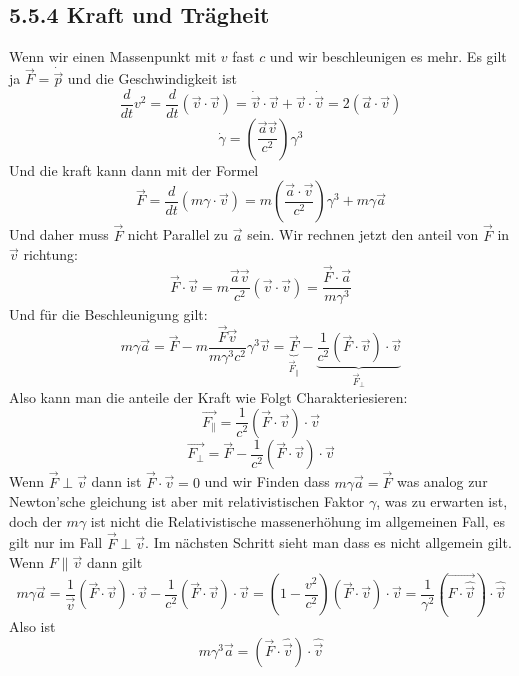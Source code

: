 \documentclass{article}
\begin{document}
\subsection*{5.5.4 Kraft und Trägheit}
Wenn wir einen Massenpunkt mit $v$ fast $c$ und wir beschleunigen es mehr. Es gilt ja $\vec{F}=\dot{\vec{p}}$ und die Geschwindigkeit ist \[\frac{d}{dt}v^2=\frac{d}{dt}(\vec{v}\cdot\vec{v})=\dot{\vec{v}}\cdot\vec{v}+\vec{v}\cdot\dot{\vec{v}}=2(\vec{a}\cdot \vec{v})\]\[\dot{\gamma}=\left(\frac{\vec{a}\vec{v}}{c^2}\right)\gamma^3\]
Und die kraft kann dann mit der Formel \[\vec{F}=\frac{d}{dt}\left(m\gamma\cdot \vec{v}\right)=m\left(\frac{\vec{a}\cdot\vec{v}}{c^2}\right)\gamma^3+m\gamma\vec{a}\] Und daher muss $\vec{F}$ nicht Parallel zu $\vec{a}$ sein.
Wir rechnen jetzt den anteil von $\vec{F}$ in $\vec{v}$ richtung: \[\vec{F}\cdot\vec{v}=m\frac{\vec{a}\vec{v}}{c^2}(\vec{v}\cdot\vec{v})=\frac{\vec{F}\cdot\vec{a}}{m\gamma^3}\]
Und für die Beschleunigung gilt:\[m\gamma \vec{a}=\vec{F}-m\frac{\vec{F}\vec{v}}{m\gamma^3c^2}\gamma^3\vec{v}=\underset{\vec{F}_\parallel}{\underbrace{\vec{F}}}-\underset{\vec{F}_\perp}{\underbrace{\frac{1}{c^2}(\vec{F}\cdot\vec{v})\cdot\vec{v}}}\]
Also kann man die anteile der Kraft wie Folgt Charakteriesieren:
\[\vec{F_\parallel}=\frac{1}{c^2}(\vec{F}\cdot\vec{v})\cdot\vec{v}\]
\[\vec{F_\perp}=\vec{F}-\frac{1}{c^2}(\vec{F}\cdot\vec{v})\cdot\vec{v}\]
Wenn $\vec{F}\perp\vec{v}$ dann ist $\vec{F}\cdot\vec{v}=0$ und wir Finden dass $m\gamma \vec{a}=\vec{F}$ was analog zur Newton'sche gleichung ist aber mit relativistischen Faktor $\gamma$, was zu erwarten ist, doch der $m\gamma$ ist nicht die Relativistische massenerhöhung im allgemeinen Fall, es gilt nur im Fall $\vec{F}\perp\vec{v}$.
\newline Im nächsten Schritt sieht man dass es nicht allgemein gilt. Wenn $F\parallel\vec{v}$ dann gilt \[m\gamma \vec{a}=\frac{1}{\vec{v}}(\vec{F}\cdot\vec{v})\cdot\vec{v}-\frac{1}{c^2}(\vec{F}\cdot\vec{v})\cdot\vec{v}=\left(1-\frac{v^2}{c^2}\right)\left(\vec{F}\cdot\vec{v}\right)\cdot\vec{v}=\frac{1}{\gamma^2}(\vec{F\cdot\hat{\vec{v}}})\cdot\hat{\vec{v}}\]
Also ist \[m\gamma^3\vec{a}=(\vec{F}\cdot\hat{\vec{v}})\cdot\hat{\vec{v}}\]
\end{document}
